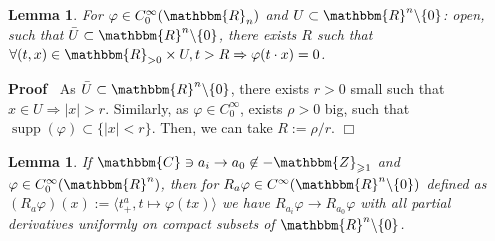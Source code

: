 \documentclass{article}
\newcommand{\assign}{:=}
\newcommand{\nin}{\not\in}
\newcommand{\tmop}[1]{\ensuremath{\operatorname{#1}}}
\renewenvironment{proof}{\noindent\textbf{Proof\ }}{\hspace*{\fill}$\Box$\medskip}
\newtheorem{lemma}[proposition]{Lemma}
\theoremstyle{remark}
\begin{document}
\begin{lemma}
  \label{holomorphicity-preserving:lem-phi-satisfies}For $\varphi \in
  C^{\infty}_0 (\mathbbm{R}_n)$ and $U \subset \mathbbm{R}^n \backslash \{ 0
  \}$: open, such that $\bar{U} \subset \mathbbm{R}^n \backslash \{ 0 \}$,
  there exists $R$ such that $\forall (t, x) \in \mathbbm{R}_{> 0} \times U, t
  > R \Rightarrow \varphi (t \cdot x) = 0$.
\end{lemma}

\begin{proof}
  As $\bar{U} \subset \mathbbm{R}^n \backslash \{ 0 \}$, there exists $r > 0$
  small such that $x \in U \Rightarrow | x | > r$. Similarly, as $\varphi \in
  C^{\infty}_0$, exists $\rho > 0$ big, such that $\tmop{supp} (\varphi)
  \subset \{ | x | < r \}$. Then, we can take $R \assign \rho / r$.
\end{proof}

\begin{lemma}
  \label{holomorphicity-preserving:lem-t+-cts}If $\mathbbm{C} \ni a_i
  \rightarrow a_0 \nin -\mathbbm{Z}_{\geqslant 1}$ and $\varphi \in
  C_0^{\infty} (\mathbbm{R}^n)$, then for $R_a \varphi \in C^{\infty}
  (\mathbbm{R}^n \backslash \{ 0 \})$ defined as $(R_a \varphi) (x) \assign
  \langle t_+^a, t \mapsto \varphi (t x) \rangle$ we have $R_{a_i} \varphi
  \rightarrow R_{a_0} \varphi$ with all partial derivatives uniformly on
  compact subsets of $\mathbbm{R}^n \backslash \{ 0 \}$.
\end{lemma}
\end{document}
